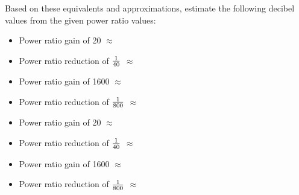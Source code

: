 \vskip 10pt

Based on these equivalents and approximations, estimate the following decibel values from the given power ratio values:

\begin{itemize}
\item{} Power ratio gain of 20 $\approx$ \underbar{\hskip 50pt}
\vskip 5pt
\item{} Power ratio reduction of $1 \over 40$ $\approx$ \underbar{\hskip 50pt} 
\vskip 5pt
\item{} Power ratio gain of 1600 $\approx$ \underbar{\hskip 50pt}
\vskip 5pt
\item{} Power ratio reduction of $1 \over 800$ $\approx$ \underbar{\hskip 50pt} 
\vskip 5pt
\end{itemize}







\begin{itemize}
\item{} Power ratio gain of 20 $\approx$ 
\vskip 5pt
\item{} Power ratio reduction of $1 \over 40$ $\approx$  
\vskip 5pt
\item{} Power ratio gain of 1600 $\approx$ 
\vskip 5pt
\item{} Power ratio reduction of $1 \over 800$ $\approx$  
\vskip 5pt
\end{itemize}











